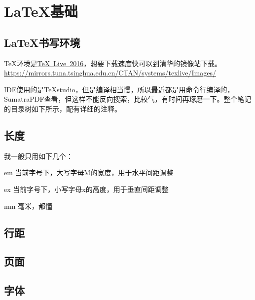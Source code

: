 {\let\clearpage\relax \chapter{\LaTeX 基础}}

\section{\LaTeX 书写环境}

\TeX 环境是\href{http://tug.org/texlive/}{TeX~Live~2016}，想要下载速度快可以到清华的镜像站下载。\url{https://mirrors.tuna.tsinghua.edu.cn/CTAN/systems/texlive/Images/}

IDE使用的是\href{http://texstudio.sourceforge.net/}{TeXstudio}，但是编译相当慢，所以最近都是用命令行编译的，SumatraPDF查看，但这样不能反向搜索，比较气，有时间再琢磨一下。整个笔记的目录树如下所示，配有详细的注释。


\section{长度}

我一般只用如下几个：

\begin{asparadesc}
    \item[em] 当前字号下，大写字母M的宽度，用于水平间距调整
    \item[ex] 当前字号下，小写字母x的高度，用于垂直间距调整
    \item[mm] 毫米，都懂
\end{asparadesc}

\section{行距}

\section{页面}

\section{字体}

